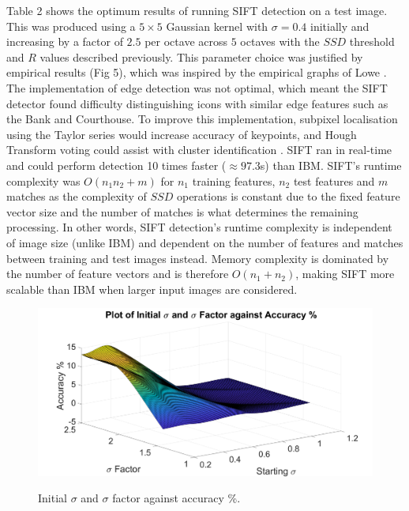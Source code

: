 \documentclass[11pt]{article}
\begin{document}
\begin{multicols}{2}
Table 2 shows the optimum results of running SIFT detection on a test image. This was produced using a $5\times5$ Gaussian kernel with $\sigma=0.4$ initially and increasing by a factor of $2.5$ per octave across $5$ octaves with the $SSD$ threshold and $R$ values described previously. This parameter choice was justified by empirical results (Fig 5), which was inspired by the empirical graphs of Lowe \citep{lowe2004}. The implementation of edge detection was not optimal, which meant the SIFT detector found difficulty distinguishing icons with similar edge features such as the Bank and Courthouse. To improve this implementation, subpixel localisation using the Taylor series would increase accuracy of keypoints, and Hough Transform voting could assist with cluster identification \citep{lowe2004}. SIFT ran in real-time and could perform detection 10 times faster ($\approx 97.3$s) than IBM. SIFT's runtime complexity was $O(n_{1}n_{2} + m)$ for $n_1$ training features, $n_2$ test features and $m$ matches as the complexity of $SSD$ operations is constant due to the fixed feature vector size and the number of matches is what determines the remaining processing. In other words, SIFT detection's runtime complexity is independent of image size (unlike IBM) and dependent on the number of features and matches between training and test images instead. Memory complexity is dominated by the number of feature vectors and is therefore $O(n_{1}+n_{2})$, making SIFT more scalable than IBM when larger input images are considered.

\setlength\abovedisplayskip{0pt}
\setlength\belowdisplayskip{0pt}
\begin{figure}[H]
\centering
\includegraphics[width=\linewidth]{img/sift-plot.png} 
\label{fig:sift-plot}\caption{Initial $\sigma$ and $\sigma$ factor against accuracy \%.}
\end{figure}
\vspace*{-\baselineskip}


\end{multicols}
\end{document}
